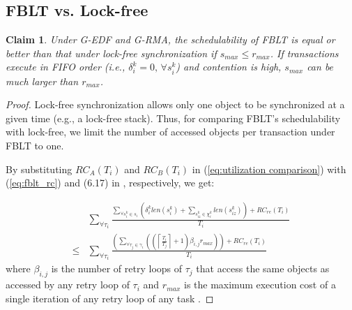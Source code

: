 \documentclass[a4paper,english]{article}
\newtheorem{clm}{Claim}
\newtheorem{proof}{Proof}
\begin{document}
\subsection{FBLT vs. Lock-free}
\label{sec:fblt vs lock free}

\begin{clm}\label{clm:fblt_edf_lock-free}
Under G-EDF and G-RMA, the schedulability of FBLT is equal or better than
that under lock-free synchronization if $s_{max}\le r_{max}$. If transactions execute in FIFO
order (i.e., $\delta_{i}^{k}=0,\,\forall s_{i}^{k}$) and contention
is high, $s_{max}$ can be much larger than $r_{max}$.
\end{clm}
\begin{proof}\normalfont
Lock-free synchronization \cite{key-5,Herlihy:2006:AMP:1146381.1146382} allows only one object to be synchronized at a given time (e.g., a lock-free stack). 
Thus, for comparing FBLT's schedulability with lock-free, we limit the number of accessed objects per transaction under FBLT to one. 

By substituting $RC_{A}(T_{i})$ and $RC_{B}(T_{i})$ in (\ref{eq:utilization comparison})
with (\ref{eq:fblt_rc}) and (6.17) in \cite{shambake_phd_proposal}, 
respectively, we get:

\begin{eqnarray}
 & \sum_{\forall\tau_{i}}\frac{\sum_{\forall s_{i}^{k}\in s_{i}}\left(\delta_{i}^{k}len(s_{i}^{k})+\sum_{s_{iz}^{k}\in\chi_{i}^{k}}len(s_{iz}^{k})\right)+RC_{re}(T_{i})}{T_{i}}\label{eq:fblt_lf_comparison_1}\\
\le & \sum_{\forall\tau_{i}}\frac{\left(\sum_{\forall\tau_{j}\in\gamma_{i}}\left(\left(\left\lceil \frac{T_{i}}{T_{j}}\right\rceil +1\right)\beta_{i,j}r_{max}\right)\right)+RC_{re}(T_{i})}{T_{i}}\nonumber 
\end{eqnarray}
where $\beta_{i,j}$ is the number of retry loops of $\tau_{j}$ that
access the same objects as accessed by any retry loop of $\tau_{i}$
\cite{key-5} and $r_{max}$ is the maximum execution cost of a single
iteration of any retry loop of any task \cite{key-5}. 



\end{proof}
\end{document}
